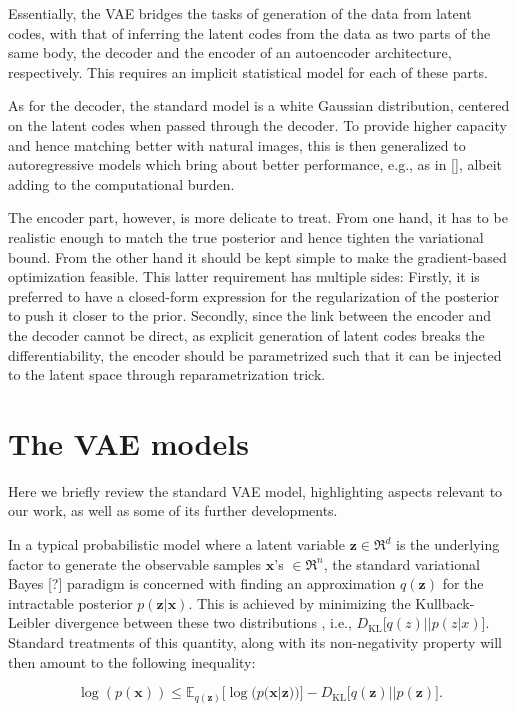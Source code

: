 \documentclass{article}
\begin{document}
Essentially, the VAE bridges the tasks of generation of the data from latent codes, with that of inferring the latent codes from the data as two parts of the same body, the decoder and the encoder of an autoencoder architecture, respectively. This requires an implicit statistical model for each of these parts.

As for the decoder, the standard model is a white Gaussian distribution, centered on the latent codes when passed through the decoder. To provide higher capacity and hence matching better with natural images, this is then generalized to autoregressive models which bring about better performance, e.g., as in [], albeit adding to the computational burden. 


The encoder part, however, is more delicate to treat. From one hand, it has to be realistic enough to match the true posterior and hence tighten the variational bound. From the other hand it should be kept simple to make the gradient-based optimization feasible. This latter requirement has multiple sides: Firstly, it is preferred to have a closed-form expression for the regularization of the posterior to push it closer to the prior. Secondly, since the link between the encoder and the decoder cannot be direct, as explicit generation of latent codes breaks the differentiability, the encoder should be parametrized such that it can be injected to the latent space through reparametrization trick.




\section{The VAE models} \label{sec:VAE}
Here we briefly review the standard VAE model, highlighting aspects relevant to our work, as well as some of its further developments.

In a typical probabilistic model where a latent variable $\mathbf{z} \in \Re^d$ is the underlying factor to generate the observable samples $\mathbf{x}$'s $\in \Re^n$, the standard variational Bayes [?] paradigm is concerned with finding an approximation $q(\mathbf{z})$ for the intractable posterior $p(\mathbf{z}|\mathbf{x})$. This is achieved by minimizing the Kullback-Leibler divergence between these two distributions , i.e., $D_{\text{KL}}\Big[ q(z) || p(z|x) \Big]$. Standard treatments of this quantity, along with its non-negativity property will then amount to the following inequality:

\begin{equation}  \label{eq:VB_ELBO}
\log(p(\mathbf{x})) \leqslant \mathbb{E}_{q(\mathbf{z})} \Big[ \log(p(\mathbf{x}|\mathbf{z}))  \Big] - D_{\text{KL}}\Big[ q(\mathbf{z}) || p(\mathbf{z}) \Big].
\end{equation}
\end{document}
